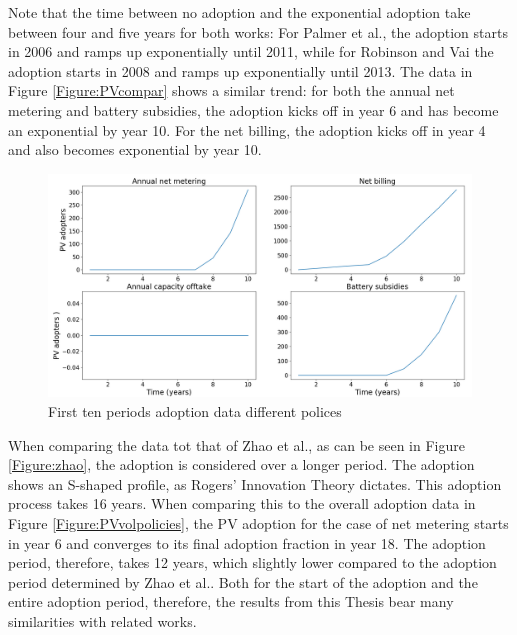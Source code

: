 Note that the time between no adoption and the exponential adoption take between four and five years for both works: For Palmer et al., the adoption starts in 2006 and ramps up exponentially until 2011, while for Robinson and Vai the adoption starts in 2008 and ramps up exponentially until 2013. The data in Figure \ref{Figure:PVcompar} shows a similar trend: for both the annual net metering and battery subsidies, the adoption kicks off in year 6 and has become an exponential by year 10. For the net billing, the adoption kicks off in year 4 and also becomes exponential by year 10. 
\begin{figure}[h!]
\centering
\includegraphics[width=12cm]{Policies/AdoptersCompar.png}
\caption{First ten periods adoption data different polices}
\label{Figure:adopters}
\end{figure}
\noindent
When comparing the data tot that of Zhao et al., as can be seen in Figure \ref{Figure:zhao}, the adoption is considered over a longer period.
The adoption shows an S-shaped profile, as Rogers' Innovation Theory dictates. This adoption process takes 16 years. When comparing this to the overall adoption data in Figure \ref{Figure:PVvolpolicies}, the PV adoption for the case of net metering starts in year 6 and converges to its final adoption fraction in year 18. The adoption period, therefore, takes 12 years, which slightly lower compared to the adoption period determined by Zhao et al.. Both for the start of the adoption and the entire adoption period, therefore, the results from this Thesis bear many similarities with related works. 
\newline \newline \noindent
